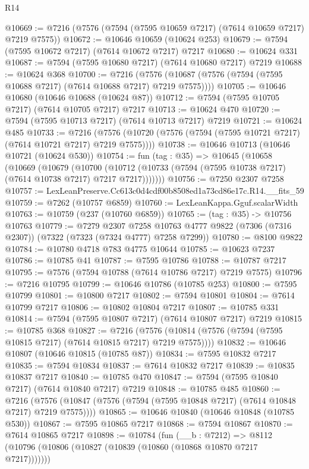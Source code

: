 \begin{lexlean}{R14}
\begin{coremodule}
@10669 := @7216 (@7576 (@7594 (@7595 @10659 @7217) (@7614 @10659 @7217) @7219 @7575))
@10672 := @10646 @10659 (@10624 @253)
@10679 := @7594 (@7595 @10672 @7217) (@7614 @10672 @7217) @7217
@10680 := @10624 @331
@10687 := @7594 (@7595 @10680 @7217) (@7614 @10680 @7217) @7219
@10688 := @10624 @368
@10700 := @7216
    (@7576 (@10687 (@7576 (@7594 (@7595 @10688 @7217) (@7614 @10688 @7217) @7219 @7575))))
@10705 := @10646 @10680 (@10646 @10688 (@10624 @87))
@10712 := @7594 (@7595 @10705 @7217) (@7614 @10705 @7217) @7217
@10713 := @10624 @470
@10720 := @7594 (@7595 @10713 @7217) (@7614 @10713 @7217) @7219
@10721 := @10624 @485
@10733 := @7216
    (@7576 (@10720 (@7576 (@7594 (@7595 @10721 @7217) (@7614 @10721 @7217) @7219 @7575))))
@10738 := @10646 @10713 (@10646 @10721 (@10624 @530))
@10754 := fun (tag : @35) =>
  @10645
    (@10658
      (@10669
        (@10679
          (@10700
            (@10712 (@10733 (@7594 (@7595 @10738 @7217) (@7614 @10738 @7217) @7217 @7217)))))))
@10756 := @7250 @2307 @7258
@10757 := LexLeanPreserve.Cc613c0d4cdf00b8508ed1a73cd86e17c.R14.__fits_59
@10759 := @7262 (@10757 @6859)
@10760 := LexLeanKappa.Gguf.scalarWidth
@10763 := @10759 (@237 (@10760 @6859))
@10765 := (tag : @35) -> @10756 @10763
@10779 := @7279
    @2307
    @7258
    @10763
    @4777
    @9822
    (@7306 (@7316 @2307))
    (@7322 (@7323 (@7324 @4777) @7258 @7299))
@10780 := @8100 @9822
@10784 := @10780 @4718 @783 @4775 @10644
@10785 := @10623 @7237
@10786 := @10785 @41
@10787 := @7595 @10786
@10788 := @10787 @7217
@10795 := @7576 (@7594 @10788 (@7614 @10786 @7217) @7219 @7575)
@10796 := @7216 @10795
@10799 := @10646 @10786 (@10785 @253)
@10800 := @7595 @10799
@10801 := @10800 @7217
@10802 := @7594 @10801
@10804 := @7614 @10799 @7217
@10806 := @10802 @10804 @7217
@10807 := @10785 @331
@10814 := @7594 (@7595 @10807 @7217) (@7614 @10807 @7217) @7219
@10815 := @10785 @368
@10827 := @7216
    (@7576 (@10814 (@7576 (@7594 (@7595 @10815 @7217) (@7614 @10815 @7217) @7219 @7575))))
@10832 := @10646 @10807 (@10646 @10815 (@10785 @87))
@10834 := @7595 @10832 @7217
@10835 := @7594 @10834
@10837 := @7614 @10832 @7217
@10839 := @10835 @10837 @7217
@10840 := @10785 @470
@10847 := @7594 (@7595 @10840 @7217) (@7614 @10840 @7217) @7219
@10848 := @10785 @485
@10860 := @7216
    (@7576 (@10847 (@7576 (@7594 (@7595 @10848 @7217) (@7614 @10848 @7217) @7219 @7575))))
@10865 := @10646 @10840 (@10646 @10848 (@10785 @530))
@10867 := @7595 @10865 @7217
@10868 := @7594 @10867
@10870 := @7614 @10865 @7217
@10898 := @10784
    (fun (__b : @7212) =>
    @8112 (@10796 (@10806 (@10827 (@10839 (@10860 (@10868 @10870 @7217 @7217)))))))

\end{coremodule}
\end{lexlean}

